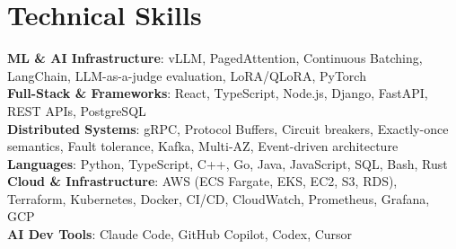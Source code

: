 \documentclass[letterpaper,11pt]{article}
\begin{document}
\section{Technical Skills}
\vspace{-7pt}
\begin{itemize}
[leftmargin=0.15in, label={}]\small{\item{
        \textbf{ML \& AI Infrastructure}{: vLLM, PagedAttention, Continuous Batching, LangChain, LLM-as-a-judge evaluation, LoRA/QLoRA, PyTorch} \\
        \textbf{Full-Stack \& Frameworks}{: React, TypeScript, Node.js, Django, FastAPI, REST APIs, PostgreSQL} \\
        \textbf{Distributed Systems}{: gRPC, Protocol Buffers, Circuit breakers, Exactly-once semantics, Fault tolerance, Kafka, Multi-AZ, Event-driven architecture} \\
        \textbf{Languages}{: Python, TypeScript, C++, Go, Java, JavaScript, SQL, Bash, Rust} \\
        \textbf{Cloud \& Infrastructure}{: AWS (ECS Fargate, EKS, EC2, S3, RDS), Terraform, Kubernetes, Docker, CI/CD, CloudWatch, Prometheus, Grafana, GCP} \\
        \textbf{AI Dev Tools}{: Claude Code, GitHub Copilot, Codex, Cursor} \\
}}
\end{itemize}
\end{document}
